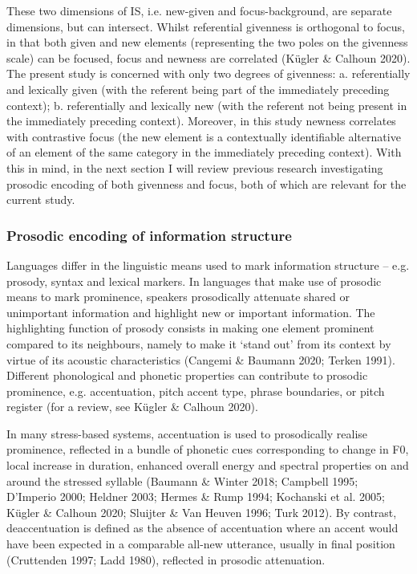 \begin{styleStandard}
These two dimensions of IS, i.e. new-given and focus-background, are separate dimensions, but can intersect. Whilst referential givenness is orthogonal to focus, in that both given and new elements (representing the two poles on the givenness scale) can be focused, focus and newness are correlated (Kügler \& Calhoun 2020). The present study is concerned with only two degrees of givenness: a. referentially and lexically given (with the referent being part of the immediately preceding context); b. referentially and lexically new (with the referent not being present in the immediately preceding context). Moreover, in this study newness correlates with contrastive focus (the new element is a contextually identifiable alternative of an element of the same category in the immediately preceding context). With this in mind, in the next section I will review previous research investigating prosodic encoding of both givenness and focus, both of which are relevant for the current study.
\end{styleStandard}

\subsubsection[Prosodic encoding of information structure]{Prosodic encoding of information structure}
\hypertarget{Toc191305885}{}\begin{styleStandard}
Languages differ in the linguistic means used to mark information structure – e.g. prosody, syntax and lexical markers. In languages that make use of prosodic means to mark prominence, speakers prosodically attenuate shared or unimportant information and highlight new or important information. The highlighting function of prosody consists in making one element prominent compared to its neighbours, namely to make it ‘stand out’ from its context by virtue of its acoustic characteristics (Cangemi \& Baumann 2020; Terken 1991). Different phonological and phonetic properties can contribute to prosodic prominence, e.g. accentuation, pitch accent type, phrase boundaries, or pitch register (for a review, see Kügler \& Calhoun 2020).
\end{styleStandard}

\begin{styleStandard}
In many stress-based systems, accentuation is used to prosodically realise prominence, reflected in a bundle of phonetic cues corresponding to change in F0, local increase in duration, enhanced overall energy and spectral properties on and around the stressed syllable (Baumann \& Winter 2018; Campbell 1995; D’Imperio 2000; Heldner 2003; Hermes \& Rump 1994; Kochanski et al. 2005; Kügler \& Calhoun 2020; Sluijter \& Van Heuven 1996; Turk 2012). By contrast, deaccentuation is defined as the absence of accentuation where an accent would have been expected in a comparable all-new utterance, usually in final position (Cruttenden 1997; Ladd 1980), reflected in prosodic attenuation.
\end{styleStandard}

